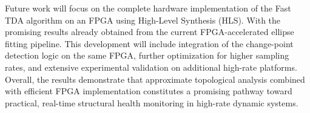 \documentclass[colorlinks,upint,subscriptcorrection,varvw,hyphenate,balance,greek,russian,vietnamese,german]{asmeconf} %
\begin{document}
Future work will focus on the complete hardware implementation of the Fast TDA algorithm on an FPGA using High-Level Synthesis (HLS). With the promising results already obtained from the current FPGA-accelerated ellipse fitting pipeline. This development will include integration of the change-point detection logic on the same FPGA, further optimization for higher sampling rates, and extensive experimental validation on additional high-rate platforms. Overall, the results demonstrate that approximate topological analysis combined with efficient FPGA implementation constitutes a promising pathway toward practical, real-time structural health monitoring in high-rate dynamic systems.







\end{document}
